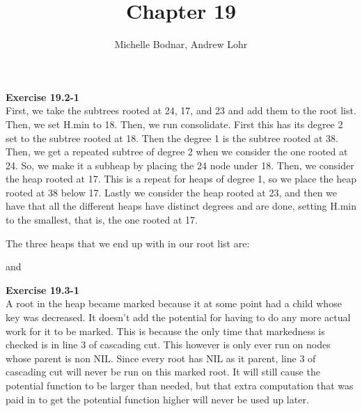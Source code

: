 \documentclass{article}
\title{Chapter 19}
\author{Michelle Bodnar, Andrew Lohr}
\begin{document}
\maketitle


\noindent\textbf{Exercise 19.2-1}\\

First, we take the subtrees rooted at 24, 17, and 23 and add them to the root list. Then, we set H.min to 18. Then, we run consolidate. First this has its degree 2 set to the subtree rooted at 18. Then the degree 1 is the subtree rooted at 38. Then, we get a repeated subtree of degree 2 when we consider the one rooted at 24. So, we make it a subheap by placing the 24 node under 18. Then, we consider the heap rooted at 17. This is a repeat for heaps of degree 1, so we place the heap rooted at 38 below 17. Lastly we consider the heap rooted at 23, and then we have that all the different heaps have distinct degrees and are done, setting H.min to the smallest, that is, the one rooted at 17.

The three heaps that we end up with in our root list are:



and


\noindent\textbf{Exercise 19.3-1}\\

A root in the heap became marked because it at some point had a child whose key was decreased. It doesn't add the potential for having to do any more actual work for it to be marked. This is because the only time that markedness is checked is in line 3 of cascading cut. This however is only ever run on nodes whose parent is non NIL. Since every root has NIL as it parent, line 3 of cascading cut will never be run on this marked root. It will still cause the potential function to be larger than needed, but that extra computation that was paid in to get the potential function higher will never be used up later.\\
\end{document}
